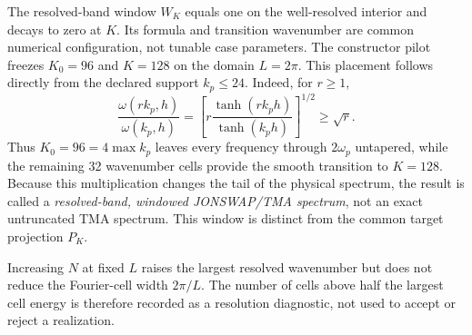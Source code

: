 \documentclass[11pt]{article}
\begin{document}
The resolved-band window $W_K$ equals one on the well-resolved interior and
decays to zero at $K$.  Its formula and transition wavenumber are common numerical
configuration, not tunable case parameters.  The constructor pilot freezes
$K_0=96$ and $K=128$ on the domain $L=2\pi$.
This placement follows directly from the declared support $k_p\leq24$.
Indeed, for $r\geq1$,
\[
  \frac{\omega(rk_p,h)}{\omega(k_p,h)}
  =
  \left[
    r\frac{\tanh(rk_ph)}{\tanh(k_ph)}
  \right]^{1/2}
  \geq\sqrt r.
\]
Thus $K_0=96=4\max k_p$ leaves every frequency through $2\omega_p$
untapered, while the remaining 32 wavenumber cells provide the smooth
transition to $K=128$.
Because this multiplication changes the tail of the physical spectrum, the
result is called a \emph{resolved-band, windowed JONSWAP/TMA spectrum}, not an
exact untruncated TMA spectrum.  This window is distinct from the
common target projection $P_K$.

Increasing $N$ at fixed $L$ raises the largest resolved wavenumber but does
not reduce the Fourier-cell width $2\pi/L$.  The number of cells above half
the largest cell energy is therefore recorded as a resolution diagnostic,
not used to accept or reject a realization.
\end{document}
